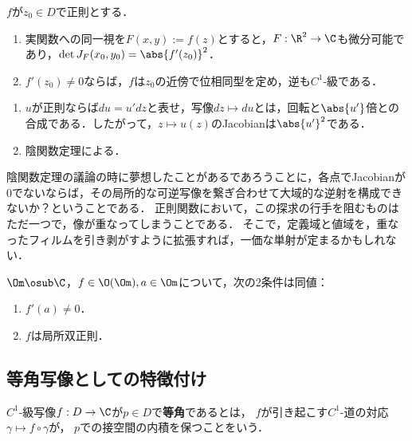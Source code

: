 \documentclass[uplatex, dvipdfmx]{jsreport}
\begin{document}
\begin{corollary}[正則関数の微分係数の各種表現とJacobianの特徴付け]
    $f$が$z_0\in D$で正則とする．
    \begin{enumerate}
        \item 実関数への同一視を$F(x,y):=f(z)$とすると，$F:\R^2\to\C$も微分可能であり，$\det J_F(x_0,y_0)=\abs{f'(z_0)}^2$．
        \item $f'(z_0)\ne0$ならば，$f$は$z_0$の近傍で位相同型を定め，逆も$C^1$-級である．
    \end{enumerate}
\end{corollary}
\begin{Proof}\mbox{}
    \begin{enumerate}
        \item $u$が正則ならば$du=u'dz$と表せ，写像$dz\mapsto du$とは，回転と$\abs{u'}$倍との合成である．したがって，$z\mapsto u(z)$のJacobianは$\abs{u'}^2$である．
        \item 陰関数定理による．
    \end{enumerate}
\end{Proof}
\begin{remarks}[大域的な可逆性とRiemann面のアイデア]
    陰関数定理の議論の時に夢想したことがあるであろうことに，各点でJacobianが$0$でないならば，その局所的な可逆写像を繋ぎ合わせて大域的な逆射を構成できないか？ということである．
    正則関数において，この探求の行手を阻むものはただ一つで，像が重なってしまうことである．
    そこで，定義域と値域を，重なったフィルムを引き剥がすように拡張すれば，一価な単射が定まるかもしれない．
\end{remarks}

\begin{corollary}
    $\Om\osub\C$，$f\in\O(\Om),a\in\Om$について，次の2条件は同値：
    \begin{enumerate}
        \item $f'(a)\ne0$．
        \item $f$は局所双正則．
    \end{enumerate}
\end{corollary}

\subsection{等角写像としての特徴付け}

\begin{definition}
    $C^1$-級写像$f:D\to\C$が$p\in D$で\textbf{等角}であるとは，
    $f$が引き起こす$C^1$-道の対応$\gamma\mapsto f\circ\gamma$が，
    $p$での接空間の内積を保つことをいう．
\end{definition}
\end{document}
